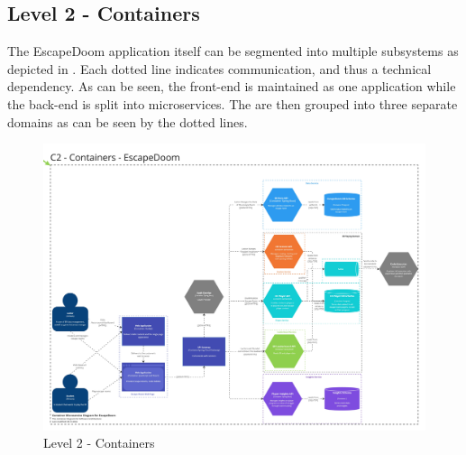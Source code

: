 \newpage

\subsection{Level 2 - Containers}\label{sub:5:l2}

The EscapeDoom application itself can be segmented into multiple subsystems as depicted in . Each dotted line indicates communication, and thus a technical dependency. As can be seen, the front-end is maintained as one application while the back-end is split into microservices. The are then grouped into three separate domains as can be seen by the dotted lines.

\begin{figure}[h!tbp]
    \centering
    \includegraphics[width=0.9\linewidth]{images/C4/C2 - Containers.jpg}
    \caption{Level 2 - Containers}
    \label{fig:c4:c2}
\end{figure}

